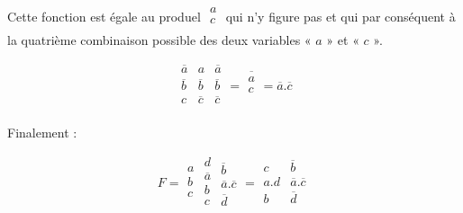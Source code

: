 \medskip 

Cette fonction est égale au produel $\begin{array}{|c|} a \\ c\\ \end{array} $ qui n'y figure pas et qui par conséquent à la quatrième combinaison possible des deux variables « $a$ » et « $c$ ». 

\medskip
 
 \[
 \begin{array}{|c|c|c|} \overline{a} & a & \overline{a} \\
                       \overline{b} &  \overline{b} &  \overline{b} \\
                      c            &  \overline{c} &  \overline{c}  \\    
\end{array}  = \overline{\begin{array}{|c|} a \\ c\\ \end{array} } 
             = \overline{a} . \overline{c} 
 \]
 
 \medskip  

Finalement : 

\medskip

\[ F = 
\begin{array}{|c}  a \\ b \\ c \\  \end{array} \begin{array}{|c|} d \\ \overline{a} \\  b \\ c \\ \end{array} \begin{array}{c|}  \overline{b} \\ \overline{a} . \overline{c} \\
\overline{d} \end{array}  
   = \begin{array}{|c|c|} c & \overline{b} \\ a . d & \overline{a} . \overline{c} \\ b & \overline{d} \\ \end{array}  
\]

\medskip 

